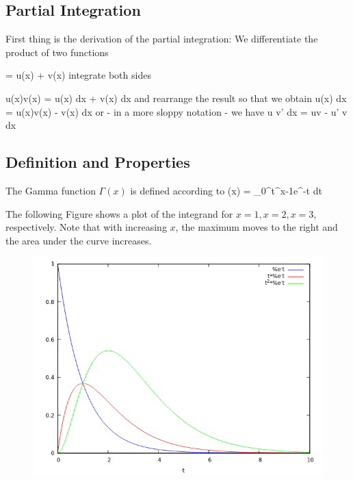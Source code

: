 
\subsection{Partial Integration}

First thing is the derivation of the partial integration: We differentiate the product of two functions

\bee
{} = u(x)  + v(x) 
\eee
%
integrate both sides

\bee
u(x)v(x) = \int u(x)  dx + \int v(x)  dx
\eee
%
and rearrange the result so that we obtain
%
\bee
\int u(x)  dx = u(x)v(x) - \int v(x)  dx
\eee
%
or - in a more sloppy notation - we have
%
\bee
\int u v' dx = uv - \int u' v dx
\eee

\subsection{Definition and Properties}

The Gamma function $\Gamma(x)$ is defined according to
%
\bee
\Gamma(x) = \int_0^\infty t^{x-1}e^{-t} dt
\eee

The following Figure shows a plot of the integrand for $x=1, x=2, x=3$, respectively. Note that with increasing $x$, the maximum moves to the right and the area under the curve increases.

\begin{figure}[hbt!]
\centering
\includegraphics[scale=0.7]{images/gamma_integrand_plot.png}
\end{figure}

